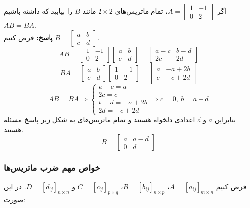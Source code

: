 \begin{example}
	اگر
	$A=
	\begin{bmatrix}
		1 & -1 \\
		0 & 2
	\end{bmatrix}$،
	تمام ماتریس‌های
	$2 \times 2$
	مانند $B$ را بیابید که داشته باشیم
	$AB=BA$. \\
	\textbf{پاسخ:}
	فرض کنیم
	$B=
	\begin{bmatrix}
		a & b \\
		c & d
	\end{bmatrix}$.
	\[
	AB =
	\begin{bmatrix}
		1 & -1 \\
		0 & 2
	\end{bmatrix}
	\begin{bmatrix}
		a & b \\
		c & d
	\end{bmatrix}
	=
	\begin{bmatrix}
		a-c & b-d \\
		2c & 2d
	\end{bmatrix}
	\]
	\[
	BA =
	\begin{bmatrix}
		a & b \\
		c & d
	\end{bmatrix}
	\begin{bmatrix}
		1 & -1 \\
		0 & 2
	\end{bmatrix}
	=
	\begin{bmatrix}
		a & -a+2b \\
		c & -c+2d
	\end{bmatrix}
	\]
	\[
	AB=BA \Rightarrow
	\begin{cases}
		a-c=a \\
		2c=c \\
		b-d=-a+2b \\
		2d=-c+2d
	\end{cases}
	\Rightarrow
	c=0 , \ b=a-d
	\]
	بنابراین $a$ و $d$ اعدادی دلخواه هستند و تمام ماتریس‌های به شکل زیر پاسخ مسئله هستند.
	\[
	B=
	\begin{bmatrix}
		a & a-d \\
		0 & d
	\end{bmatrix}
	\]
\end{example}

\subsubsection*{خواص مهم ضرب ماتریس‌ها}
فرض کنیم
$A=[a_{ij}]_{m \times n}$،
$B=[b_{ij}]_{n \times p}$،
$C=[c_{ij}]_{p \times q}$ و
$D=[d_{ij}]_{n \times n}$.
در این صورت:

